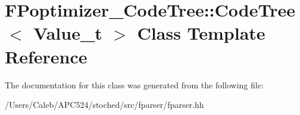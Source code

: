 \hypertarget{class_f_poptimizer___code_tree_1_1_code_tree}{}\section{F\+Poptimizer\+\_\+\+Code\+Tree\+:\+:Code\+Tree$<$ Value\+\_\+t $>$ Class Template Reference}
\label{class_f_poptimizer___code_tree_1_1_code_tree}


The documentation for this class was generated from the following file\+:\begin{DoxyCompactItemize}
\item 
/\+Users/\+Caleb/\+A\+P\+C524/stoched/src/fparser/fparser.\+hh\end{DoxyCompactItemize}
